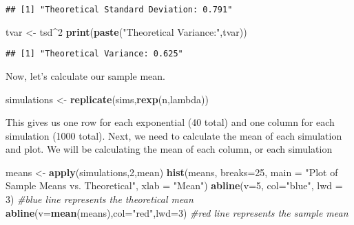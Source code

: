 \documentclass[]{article}
\newenvironment{Shaded}{\begin{snugshade}}{\end{snugshade}}
\newcommand{\KeywordTok}[1]{\textcolor[rgb]{0.13,0.29,0.53}{\textbf{#1}}}
\newcommand{\DataTypeTok}[1]{\textcolor[rgb]{0.13,0.29,0.53}{#1}}
\newcommand{\DecValTok}[1]{\textcolor[rgb]{0.00,0.00,0.81}{#1}}
\newcommand{\StringTok}[1]{\textcolor[rgb]{0.31,0.60,0.02}{#1}}
\newcommand{\CommentTok}[1]{\textcolor[rgb]{0.56,0.35,0.01}{\textit{#1}}}
\newcommand{\OperatorTok}[1]{\textcolor[rgb]{0.81,0.36,0.00}{\textbf{#1}}}
\newcommand{\NormalTok}[1]{#1}
\begin{document}
\begin{verbatim}
## [1] "Theoretical Standard Deviation: 0.791"
\end{verbatim}

\begin{Shaded}
\begin{Highlighting}[]
\NormalTok{tvar <-}\StringTok{ }\NormalTok{tsd}\OperatorTok{^}\DecValTok{2}
\KeywordTok{print}\NormalTok{(}\KeywordTok{paste}\NormalTok{(}\StringTok{"Theoretical Variance:"}\NormalTok{,tvar))}
\end{Highlighting}
\end{Shaded}

\begin{verbatim}
## [1] "Theoretical Variance: 0.625"
\end{verbatim}

Now, let's calculate our sample mean.

\begin{Shaded}
\begin{Highlighting}[]
\NormalTok{simulations <-}\StringTok{ }\KeywordTok{replicate}\NormalTok{(sims,}\KeywordTok{rexp}\NormalTok{(n,lambda)) }
\end{Highlighting}
\end{Shaded}

This gives us one row for each exponential (40 total) and one column for
each simulation (1000 total). Next, we need to calculate the mean of
each simulation and plot. We will be calculating the mean of each
column, or each simulation

\begin{Shaded}
\begin{Highlighting}[]
\NormalTok{means <-}\StringTok{ }\KeywordTok{apply}\NormalTok{(simulations,}\DecValTok{2}\NormalTok{,mean)}
\KeywordTok{hist}\NormalTok{(means, }\DataTypeTok{breaks=}\DecValTok{25}\NormalTok{, }\DataTypeTok{main =} \StringTok{"Plot of Sample Means vs. Theoretical"}\NormalTok{, }\DataTypeTok{xlab =} \StringTok{"Mean"}\NormalTok{)}
\KeywordTok{abline}\NormalTok{(}\DataTypeTok{v=}\DecValTok{5}\NormalTok{, }\DataTypeTok{col=}\StringTok{"blue"}\NormalTok{, }\DataTypeTok{lwd =} \DecValTok{3}\NormalTok{) }\CommentTok{#blue line represents the theoretical mean}
\KeywordTok{abline}\NormalTok{(}\DataTypeTok{v=}\KeywordTok{mean}\NormalTok{(means),}\DataTypeTok{col=}\StringTok{"red"}\NormalTok{,}\DataTypeTok{lwd=}\DecValTok{3}\NormalTok{) }\CommentTok{#red line represents the sample mean}
\end{Highlighting}
\end{Shaded}
\end{document}
